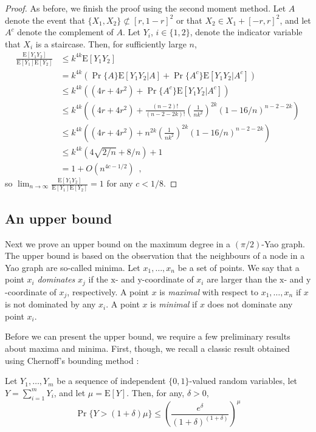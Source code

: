 \documentclass[lotsofwhite,charterfonts]{patmorin}
\newcommand{\PROB}{\Pr}
\newcommand{\EXP}{\mathrm{E}}
\begin{document}
\begin{proof}
As before, we finish the proof using the second moment method.  Let $A$
denote the event that $\{X_1,X_2\}\not\subset[r,1-r]^2$ or that $X_2\in
X_1+[-r,r]^2$, and let $A^c$ denote the complement of $A$.  Let $Y_i$,
$i\in\{1,2\}$, denote the indicator variable that $X_i$ is a staircase.
Then, for sufficiently large $n$,
\[
  \begin{aligned}
    \frac{\EXP[Y_1Y_2]}{\EXP[Y_1]\EXP[Y_2]}
      & \le k^{4k} \EXP[Y_1Y_2] \\
      & = k^{4k} (\PROB\{A\}\EXP[Y_1Y_2|{A}]
             +\PROB\{A^c\}\EXP[Y_1Y_2|A^c]) \\
      & \le k^{4k} ((4r+4r^2) + \Pr\{A^c\}\EXP[Y_1Y_2|A^c]) \\
      & \le k^{4k} \left((4r+4r^2) + \frac{(n-2)!}{(n-2-2k)!}\left(\frac{1}{nk^2}\right)^{2k}(1-16/n)^{n-2-2k}\right) \\
      & \le k^{4k} \left((4r+4r^2) + n^{2k}\left(\frac{1}{nk^2}\right)^{2k}(1-16/n)^{n-2-2k}\right) \\
      & \le k^{4k}\left(4\sqrt{2/n}+ 8/n\right) + 1  \\
      & = 1 + O(n^{4c-1/2}) \enspace ,
  \end{aligned}
\]
so $\lim_{n\rightarrow\infty} \frac{\EXP[Y_1Y_2]}{\EXP[Y_1]\EXP[Y_2]} = 1$
for any $c<1/8$.
\end{proof}

\subsection{An upper bound}

Next we prove an upper bound on the maximum degree in a $(\pi/2)$-Yao graph.
The upper bound is based on the observation that the neighbours of a node
in a Yao graph are so-called minima.  Let $x_1,\ldots,x_n$ be a set of
points. We say that a point $x_i$ \emph{dominates} $x_j$ if the
$\mathrm{x}$- and $\mathrm{y}$-coordinate of $x_i$ are larger than the
$\mathrm{x}$- and $\mathrm{y}$-coordinate of $x_j$, respectively.  A point
$x$ is \emph{maximal} with respect to $x_1,\ldots,x_n$ if $x$ is not
dominated by any $x_i$.  A point $x$ is \emph{minimal} if $x$ does not
dominate any point $x_i$.

Before we can present the upper bound, we require a few preliminary results
about maxima and minima.  First, though, we recall a classic result 
obtained using Chernoff's bounding method \cite{c52}:

\begin{lem}
Let $Y_1,\ldots,Y_m$ be a sequence of independent $\{0,1\}$-valued
random variables, let $Y=\sum_{i=1}^m Y_i$, and let $\mu=\EXP[Y]$.
Then, for any, $\delta > 0$,
\[
   \Pr\{Y > (1+\delta)\mu\} 
     \le \left(\frac{e^{\delta}}{(1+\delta)^{(1+\delta)}}\right)^{\mu}
\]
\end{lem}
\end{document}
